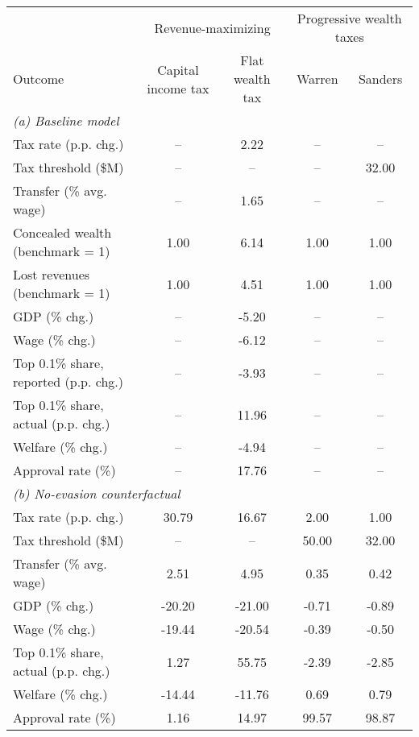 \footnotesize
\renewcommand{\arraystretch}{1.2}
\begin{tabular}{lcccc}
\toprule
&\multicolumn{2}{c}{Revenue-maximizing} & \multicolumn{2}{c}{Progressive wealth taxes}\\
\cmidrule(rl){2-3}\cmidrule(rl){4-5}
Outcome & Capital income tax & Flat wealth tax & Warren & Sanders\\
\midrule
\multicolumn{5}{l}{\textit{(a) Baseline model}}\\
Tax rate (p.p. chg.)&--&2.22&--&--\\
Tax threshold (\$M)&--&--&--&32.00\\
Transfer (\% avg. wage)&--&1.65&--&--\\
[1.0ex]Concealed wealth (benchmark = 1)&1.00&6.14&1.00&1.00\\
Lost revenues (benchmark = 1)&1.00&4.51&1.00&1.00\\
[1.0ex]GDP (\% chg.)&--&-5.20&--&--\\
Wage (\% chg.)&--&-6.12&--&--\\
[1.0ex]Top 0.1\% share, reported (p.p. chg.)&--&-3.93&--&--\\
Top 0.1\% share, actual (p.p. chg.)&--&11.96&--&--\\
[1.0ex]Welfare (\% chg.)&--&-4.94&--&--\\
Approval rate (\%)&--&17.76&--&--\\
\midrule
\multicolumn{5}{l}{\textit{(b) No-evasion counterfactual}}\\
Tax rate (p.p. chg.)&30.79&16.67&2.00&1.00\\
Tax threshold (\$M)&--&--&50.00&32.00\\
Transfer (\% avg. wage)&2.51&4.95&0.35&0.42\\
[1.0ex]GDP (\% chg.)&-20.20&-21.00&-0.71&-0.89\\
Wage (\% chg.)&-19.44&-20.54&-0.39&-0.50\\
[1.0ex]Top 0.1\% share, actual (p.p. chg.)&1.27&55.75&-2.39&-2.85\\
[1.0ex]Welfare (\% chg.)&-14.44&-11.76&0.69&0.79\\
Approval rate (\%)&1.16&14.97&99.57&98.87\\
\bottomrule
\end{tabular}
\normalsize
